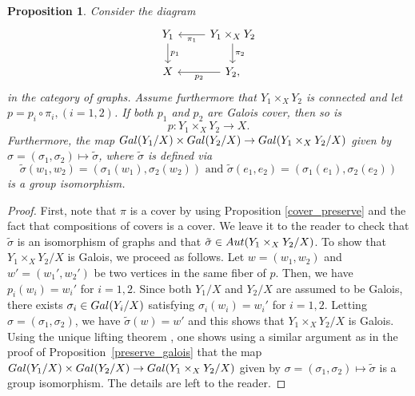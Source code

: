 \documentclass[11pt]{amsart}
\newtheorem{proposition}[theorem]{Proposition}
\numberwithin{equation}{section}
\theoremstyle{remark}
\begin{document}
\begin{proposition} \label{all_disjoint}
Consider the diagram
\begin{equation*}
\begin{tikzcd}
Y_{1} \arrow["p_{1}",d] &\arrow["\pi_{1}",l] \arrow["\pi_{2}",d] Y_{1} \times_{X}Y_{2}  \\
X & \arrow["p_{2}",l] Y_{2},
\end{tikzcd}
\end{equation*}
in the category of graphs.  Assume furthermore that $Y_{1}\times_{X}Y_{2}$ is connected and let $p = p_{i} \circ \pi_{i}, (i=1,2)$.  If both $p_{1}$ and $p_{2}$ are Galois cover, then so is 
$$p:Y_{1} \times_{X} Y_{2} \rightarrow X.$$  
Furthermore, the map ${\rm Gal}(Y_{1}/X) \times {\rm Gal}(Y_{2}/X) \rightarrow {\rm Gal}(Y_{1}\times_{X}Y_{2}/X)$ given by $\sigma  =(\sigma_{1},\sigma_{2}) \mapsto \tilde{\sigma}$, where $\tilde{\sigma}$ is defined via
$$\tilde{\sigma}(w_{1},w_{2}) = (\sigma_{1}(w_{1}),\sigma_{2}(w_{2})) \text{ and } \tilde{\sigma}(e_{1},e_{2}) = (\sigma_{1}(e_{1}),\sigma_{2}(e_{2})) $$
is a group isomorphism.
\end{proposition}
\begin{proof}
First, note that $\pi$ is a cover by using Proposition \ref{cover_preserve} and the fact that compositions of covers is a cover.  We leave it to the reader to check that $\tilde{\sigma}$ is an isomorphism of graphs and that $\tilde{\sigma} \in {\rm Aut}(Y_{1} \times_{X}Y_{2}/X)$.  To show that $Y_{1}\times_{X}Y_{2}/X$ is Galois, we proceed as follows.  Let $w = (w_{1},w_{2})$ and $w' = (w_{1}',w_{2}')$ be two vertices in the same fiber of $p$.  Then, we have $p_{i}(w_{i}) = w_{i}'$ for $i=1,2$.  Since both $Y_{1}/X$ and $Y_{2}/X$ are assumed to be Galois, there exists $\sigma_{i} \in {\rm Gal}(Y_{i}/X)$ satisfying $\sigma_{i}(w_{i}) = w_{i}'$ for $i=1,2$.  Letting $\sigma = (\sigma_{1},\sigma_{2})$, we have $\tilde{\sigma}(w)=w'$ and this shows that $Y_{1}\times_{X}Y_{2}/X$ is Galois.  Using the unique lifting theorem \cite[Theorem 5.1]{Sunada:2013}, one shows using a similar argument as in the proof of Proposition~\ref{preserve_galois} that the map ${\rm Gal}(Y_{1}/X) \times {\rm Gal}(Y_{2}/X) \rightarrow {\rm Gal}(Y_{1}\times_{X}Y_{2}/X)$ given by $\sigma  =(\sigma_{1},\sigma_{2}) \mapsto \tilde{\sigma}$ is a group isomorphism.  The details are left to the reader.
\end{proof}
\end{document}
